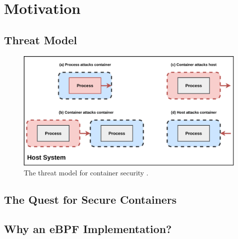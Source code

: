 \section{Motivation}
\label{sec:motivation}

\subsection{Threat Model}%
\label{sub:threat_model}

\begin{figure}[htpb]
  \centering
  \includegraphics[width=0.8\linewidth]{figs/threat-model.pdf}
  \caption{The threat model for container security \cite{sultan2019_container_security}. }%
  \label{fig:threat_model}
\end{figure}

\subsection{The Quest for Secure Containers}%
\label{sub:secure_containers}

\subsection{Why an eBPF Implementation?}%
\label{sub:why_ebpf}

